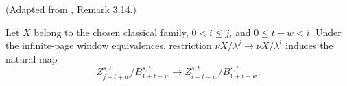 \begin{theorem}
\label{frontier:Literature:636e4c89b3e4}
(Adapted from \cite{LWX126}, Remark 3.14.)\par{}

Let $X$ belong to the chosen classical family, $0<i\le j$, and $0\le t-w<i$. Under the infinite-page window equivalences, restriction $\nu X/\lambda^j\to\nu X/\lambda^i$ induces the natural map\[Z_{j-t+w}^{s,t}/B_{1+t-w}^{s,t}\longrightarrow Z_{i-t+w}^{s,t}/B_{1+t-w}^{s,t}.\]
\end{theorem}

